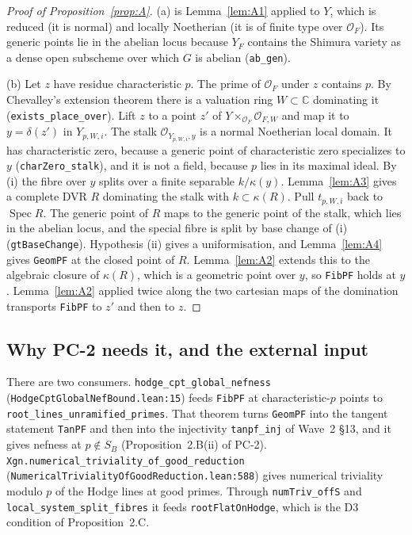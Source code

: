 \documentclass[11pt]{article}
\newcommand{\lean}[1]{\nolinkurl{#1}}
\newcommand{\Lpath}[1]{\nolinkurl{#1}}
\newcommand{\PC}[1]{PC-#1}
\theoremstyle{remark}
\begin{document}
\begin{proof}[Proof of Proposition~\ref{prop:A}]
(a) is Lemma~\ref{lem:A1} applied to $Y$, which is reduced (it is normal) and locally Noetherian (it is of finite type over $\mathcal O_F$). Its generic points lie in the abelian locus because $Y_F$ contains the Shimura variety as a dense open subscheme over which $G$ is abelian (\lean{ab_gen}).

(b) Let $z$ have residue characteristic $p$. The prime of $\mathcal O_F$ under $z$ contains $p$. By Chevalley's extension theorem there is a valuation ring $W\subset\mathbb C$ dominating it (\lean{exists_place_over}). Lift $z$ to a point $z'$ of $Y\times_{\mathcal O_F}\mathcal O_{F,W}$ and map it to $y=\delta(z')$ in $Y_{p,W,i}$. The stalk $\mathcal O_{Y_{p,W,i},y}$ is a normal Noetherian local domain. It has characteristic zero, because a generic point of characteristic zero specializes to $y$ (\lean{charZero_stalk}), and it is not a field, because $p$ lies in its maximal ideal. By (i) the fibre over $y$ splits over a finite separable $k/\kappa(y)$. Lemma~\ref{lem:A3} gives a complete DVR $R$ dominating the stalk with $k\subset\kappa(R)$. Pull $t_{p,W,i}$ back to $\operatorname{Spec}R$. The generic point of $R$ maps to the generic point of the stalk, which lies in the abelian locus, and the special fibre is split by base change of (i) (\lean{gtBaseChange}). Hypothesis (ii) gives a uniformisation, and Lemma~\ref{lem:A4} gives \lean{GeomPF} at the closed point of $R$. Lemma~\ref{lem:A2} extends this to the algebraic closure of $\kappa(R)$, which is a geometric point over $y$, so \lean{FibPF} holds at $y$. Lemma~\ref{lem:A2} applied twice along the two cartesian maps of the domination transports \lean{FibPF} to $z'$ and then to $z$.
\end{proof}

\subsection{Why \PC{2} needs it, and the external input}

There are two consumers. \lean{hodge_cpt_global_nefness} (\Lpath{HodgeCptGlobalNefBound.lean:15}) feeds \lean{FibPF} at characteristic-$p$ points to \lean{root_lines_unramified_primes}. That theorem turns \lean{GeomPF} into the tangent statement \lean{TanPF} and then into the injectivity \lean{tanpf_inj} of Wave~2 \S13, and it gives nefness at $p\notin S_B$ (Proposition~2.B(ii) of \PC{2}). \lean{Xgn.numerical_triviality_of_good_reduction} (\Lpath{NumericalTrivialityOfGoodReduction.lean:588}) gives numerical triviality modulo $p$ of the Hodge lines at good primes. Through \lean{numTriv_offS} and \lean{local_system_split_fibres} it feeds \lean{rootFlatOnHodge}, which is the D3 condition of Proposition~2.C.
\end{document}

